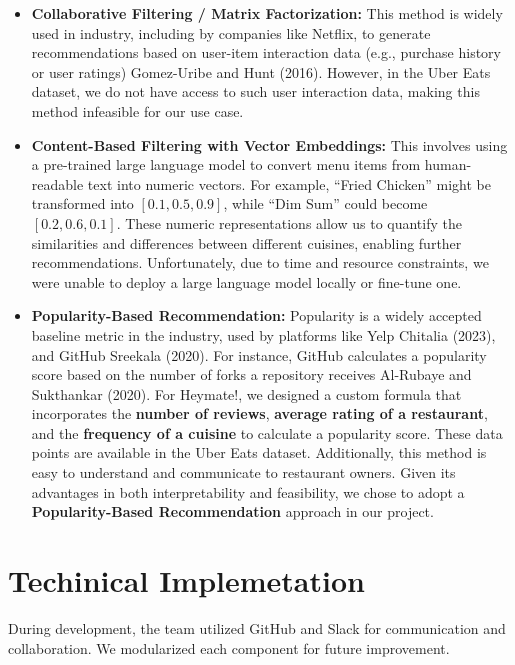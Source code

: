 \documentclass[
  11pt,
  a4paper,
  DIV=11,
  numbers=noendperiod]{scrartcl}
\providecommand{\tightlist}{%
  \setlength{\itemsep}{0pt}\setlength{\parskip}{0pt}}\usepackage{longtable,booktabs,array}
\begin{document}
\begin{itemize}
\tightlist
\item
  \textbf{Collaborative Filtering / Matrix Factorization:} This method
  is widely used in industry, including by companies like Netflix, to
  generate recommendations based on user-item interaction data (e.g.,
  purchase history or user ratings) Gomez-Uribe and Hunt (2016).
  However, in the Uber Eats dataset, we do not have access to such user
  interaction data, making this method infeasible for our use case.
\item
  \textbf{Content-Based Filtering with Vector Embeddings:} This involves
  using a pre-trained large language model to convert menu items from
  human-readable text into numeric vectors. For example, ``Fried
  Chicken'' might be transformed into \([0.1, 0.5, 0.9]\), while ``Dim
  Sum'' could become \([0.2, 0.6, 0.1]\). These numeric representations
  allow us to quantify the similarities and differences between
  different cuisines, enabling further recommendations. Unfortunately,
  due to time and resource constraints, we were unable to deploy a large
  language model locally or fine-tune one.
\item
  \textbf{Popularity-Based Recommendation:} Popularity is a widely
  accepted baseline metric in the industry, used by platforms like Yelp
  Chitalia (2023), and GitHub Sreekala (2020). For instance, GitHub
  calculates a popularity score based on the number of forks a
  repository receives Al-Rubaye and Sukthankar (2020). For Heymate!, we
  designed a custom formula that incorporates the \textbf{number of
  reviews}, \textbf{average rating of a restaurant}, and the
  \textbf{frequency of a cuisine} to calculate a popularity score. These
  data points are available in the Uber Eats dataset. Additionally, this
  method is easy to understand and communicate to restaurant owners.
  Given its advantages in both interpretability and feasibility, we
  chose to adopt a \textbf{Popularity-Based Recommendation} approach in
  our project.
\end{itemize}

\section{Techinical Implemetation}\label{techinical-implemetation}

During development, the team utilized GitHub and Slack for communication
and collaboration. We modularized each component for future improvement.
\end{document}
